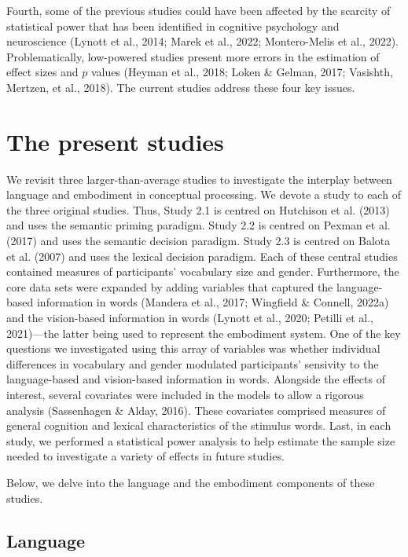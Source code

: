 \documentclass[
  12pt,
  man,floatsintext]{apa7}
\begin{document}
Fourth, some of the previous studies could have been affected by the scarcity of statistical power that has been identified in cognitive psychology and neuroscience (Lynott et al., 2014; Marek et al., 2022; Montero-Melis et al., 2022). Problematically, low-powered studies present more errors in the estimation of effect sizes and \(p\) values (Heyman et al., 2018; Loken \& Gelman, 2017; Vasishth, Mertzen, et al., 2018). The current studies address these four key issues.

\hypertarget{present-studies}{%
\section{The present studies}\label{present-studies}}

We revisit three larger-than-average studies to investigate the interplay between language and embodiment in conceptual processing. We devote a study to each of the three original studies. Thus, Study 2.1 is centred on Hutchison et al. (2013) and uses the semantic priming paradigm. Study 2.2 is centred on Pexman et al. (2017) and uses the semantic decision paradigm. Study 2.3 is centred on Balota et al. (2007) and uses the lexical decision paradigm. Each of these central studies contained measures of participants' vocabulary size and gender. Furthermore, the core data sets were expanded by adding variables that captured the language-based information in words (Mandera et al., 2017; Wingfield \& Connell, 2022a) and the vision-based information in words (Lynott et al., 2020; Petilli et al., 2021)---the latter being used to represent the embodiment system. One of the key questions we investigated using this array of variables was whether individual differences in vocabulary and gender modulated participants' sensivity to the language-based and vision-based information in words. Alongside the effects of interest, several covariates were included in the models to allow a rigorous analysis (Sassenhagen \& Alday, 2016). These covariates comprised measures of general cognition and lexical characteristics of the stimulus words. Last, in each study, we performed a statistical power analysis to help estimate the sample size needed to investigate a variety of effects in future studies.

Below, we delve into the language and the embodiment components of these studies.

\hypertarget{language}{%
\subsection{Language}\label{language}}
\end{document}
